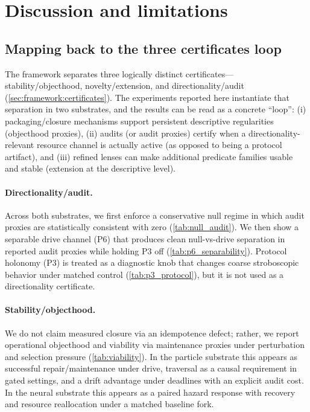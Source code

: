 \documentclass[11pt]{article}
\begin{document}
\section{Discussion and limitations}\label{sec:discussion}
\subsection{Mapping back to the three certificates loop}\label{sec:discussion:loop}
The framework separates three logically distinct certificates---stability/objecthood, novelty/extension, and directionality/audit (\cref{sec:framework:certificates}). The experiments reported here instantiate that separation in two substrates, and the results can be read as a concrete ``loop'': (i) packaging/closure mechanisms support persistent descriptive regularities (objecthood proxies), (ii) audits (or audit proxies) certify when a directionality-relevant resource channel is actually active (as opposed to being a protocol artifact), and (iii) refined lenses can make additional predicate families usable and stable (extension at the descriptive level).

\paragraph{Directionality/audit.}
Across both substrates, we first enforce a conservative null regime in which audit proxies are statistically consistent with zero (\cref{tab:null_audit}). We then show a separable drive channel (P6) that produces clean null-vs-drive separation in reported audit proxies while holding P3 off (\cref{tab:p6_separability}). Protocol holonomy (P3) is treated as a diagnostic knob that changes coarse stroboscopic behavior under matched control (\cref{tab:p3_protocol}), but it is not used as a directionality certificate.

\paragraph{Stability/objecthood.}
We do not claim measured closure via an idempotence defect; rather, we report operational objecthood and viability via maintenance proxies under perturbation and selection pressure (\cref{tab:viability}). In the particle substrate this appears as successful repair/maintenance under drive, traversal as a causal requirement in gated settings, and a drift advantage under deadlines with an explicit audit cost. In the neural substrate this appears as a paired hazard response with recovery and resource reallocation under a matched baseline fork.
\end{document}
